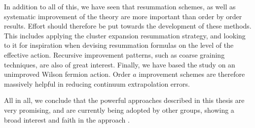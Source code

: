 In addition to all of this, we have seen that resummation schemes, as well as
systematic improvement of the theory are more important than order by order
results. Effort should therefore be put towards the development of these
methods. This includes applying the cluster expansion resummation strategy, and
looking to it for inspiration when devising resummation formulas on the level of
the effective action. Recursive improvement patterns, such as coarse graining
techniques, are also of great interest. Finally, we have based the study on an
unimproved Wilson fermion action. Order $a$ improvement schemes are therefore
massively helpful in reducing continuum extrapolation errors.

All in all, we conclude that the powerful approaches described in this thesis
are very promising, and are currently being adopted by other groups, showing a
broad interest and faith in the approach
\citep{Scior:2015vra,Scior:2016fso,Rindlisbacher:2015pea}.
